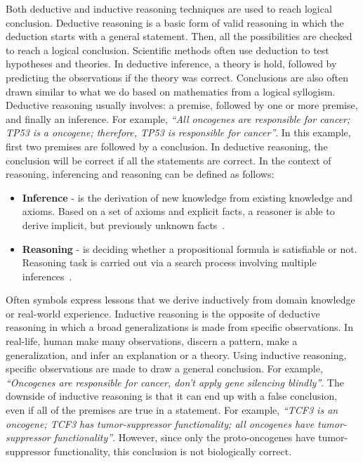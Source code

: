 \hspace*{3.5mm} Both deductive and inductive reasoning techniques are used to reach logical conclusion. Deductive reasoning is a basic form of valid reasoning in which the deduction starts with a general statement. Then, all the possibilities are checked to reach a logical conclusion. Scientific methods often use deduction to test hypotheses and theories. In deductive inference, a theory is hold, followed by predicting the observations if the theory was correct. Conclusions are also often drawn similar to what we do based on mathematics from a logical syllogism. Deductive reasoning usually involves: a premise, followed by one or more premise, and finally an inference. For example, \textit{``All oncogenes are responsible for cancer; TP53 is a oncogene; therefore, TP53 is responsible for cancer''}. In this example, first two premises are followed by a conclusion. In deductive reasoning, the conclusion will be correct if all the statements are correct. In the context of reasoning, inferencing and reasoning can be defined as follows: 

\begin{itemize}[noitemsep]
    \item \textbf{Inference} - is the derivation of new knowledge from existing knowledge and axioms. Based on a set of axioms and explicit facts, a reasoner is able to derive implicit, but previously unknown facts~\cite{hogan2020knowledge}. 
    \item \textbf{Reasoning} - is deciding whether a propositional formula is satisfiable or not. Reasoning task is carried out via a search process involving multiple inferences~\cite{hogan2020knowledge}.
\end{itemize}

\hspace*{3.5mm} Often symbols express lessons that we derive inductively from domain knowledge or real-world experience. Inductive reasoning is the opposite of deductive reasoning in which a broad generalizations is made from specific observations. In real-life, human make many observations, discern a pattern, make a generalization, and infer an explanation or a theory. Using inductive reasoning, specific observations are made to draw a general conclusion. For example, \textit{``Oncogenes are responsible for cancer, don't apply gene silencing blindly''}. The downside of inductive reasoning is that it can end up with a false conclusion, even if all of the premises are true in a statement. For example, \textit{``TCF3 is an oncogene; TCF3 has tumor-suppressor functionality; all oncogenes have tumor-suppressor functionality''}. However, since only the proto-oncogenes have tumor-suppressor functionality, this conclusion is not biologically correct.

